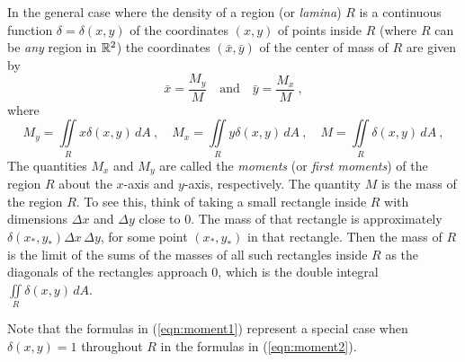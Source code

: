 In the general case where the density of a region (or \emph{lamina}) $R$ is a continuous function $\delta = \delta(x,y)$
of the coordinates
$(x,y)$ of points inside $R$ (where $R$ can be \emph{any} region in $\mathbb{R}^{2}$) the coordinates $(\bar{x},\bar{y})$ of
the center of mass of $R$ are given by
\begin{equation}\label{eqn:center2}
 \bar{x} = \frac{M_y}{M} \quad \text{and} \quad \bar{y} = \frac{M_x}{M} ~,
\end{equation}
where
\begin{equation}\label{eqn:moment2}
 M_y = \iint\limits_{R} x\delta(x,y)\,dA ~, \quad M_x = \iint\limits_{R} y\delta(x,y)\,dA ~,
 \quad M = \iint\limits_{R} \delta(x,y)\,dA ~,
\end{equation}
The quantities $M_x$ and $M_y$ are called the \emph{moments} (or \emph{first moments}) of the region $R$ about
the $x$-axis and $y$-axis, respectively.
The quantity $M$ is the mass of the region $R$. To see this, think of taking a small rectangle inside $R$ with
dimensions $\Delta x$ and $\Delta y$ close to $0$. The mass of that rectangle is approximately
$\delta(x_* ,y_* ) \Delta x \, \Delta y$, for some point $(x_* ,y_* )$ in that rectangle. Then the mass of $R$ is the
limit of the sums of the masses of all such rectangles inside $R$ as the diagonals of the rectangles approach $0$, which
is the double integral $\iint\limits_{R} \delta(x,y)\,dA$.

Note that the formulas in (\ref{eqn:moment1}) represent a special case when
$\delta(x,y) = 1$ throughout $R$ in the formulas in (\ref{eqn:moment2}).

